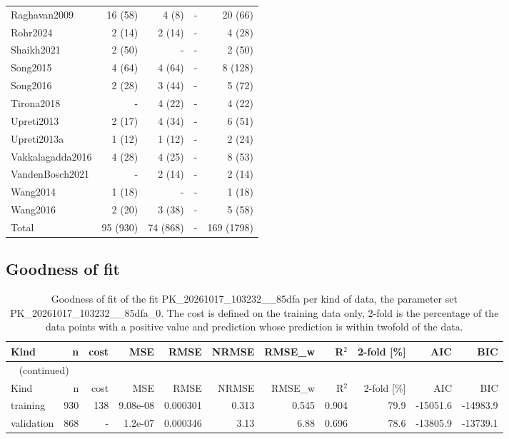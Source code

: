 \begin{longtable}{lrrrr}
Raghavan2009 & 16 (58) & 4 (8) & - & 20 (66) \\
Rohr2024 & 2 (14) & 2 (14) & - & 4 (28) \\
Shaikh2021 & 2 (50) & - & - & 2 (50) \\
Song2015 & 4 (64) & 4 (64) & - & 8 (128) \\
Song2016 & 2 (28) & 3 (44) & - & 5 (72) \\
Tirona2018 & - & 4 (22) & - & 4 (22) \\
Upreti2013 & 2 (17) & 4 (34) & - & 6 (51) \\
Upreti2013a & 1 (12) & 1 (12) & - & 2 (24) \\
Vakkalagadda2016 & 4 (28) & 4 (25) & - & 8 (53) \\
VandenBosch2021 & - & 2 (14) & - & 2 (14) \\
Wang2014 & 1 (18) & - & - & 1 (18) \\
Wang2016 & 2 (20) & 3 (38) & - & 5 (58) \\
Total & 95 (930) & 74 (868) & - & 169 (1798) \\
\end{longtable}

\subsection{Goodness of fit}

\begin{longtable}{lrrrrrrrrrr}
\caption{Goodness of fit of the fit PK\_20261017\_103232\_\_85dfa per kind of data, the parameter set PK\_20261017\_103232\_\_85dfa\_0. The cost is defined on the training data only, 2-fold is the percentage of the data points with a positive value and prediction whose prediction is within twofold of the data.}\label{tab:metrics:PK_20261017_103232__85dfa} \\
\toprule
Kind & n & cost & MSE & RMSE & NRMSE & RMSE\_w & R\ensuremath{^{2}} & 2-fold [\%] & AIC & BIC \\
\midrule
\endfirsthead
\multicolumn{11}{l}{\small\tablename~\thetable{} (continued)} \\
\toprule
Kind & n & cost & MSE & RMSE & NRMSE & RMSE\_w & R\ensuremath{^{2}} & 2-fold [\%] & AIC & BIC \\
\midrule
\endhead
\bottomrule
\endlastfoot
training & 930 & 138 & 9.08e-08 & 0.000301 & 0.313 & 0.545 & 0.904 & 79.9 & -15051.6 & -14983.9 \\
validation & 868 & - & 1.2e-07 & 0.000346 & 3.13 & 6.88 & 0.696 & 78.6 & -13805.9 & -13739.1 \\
\end{longtable}

